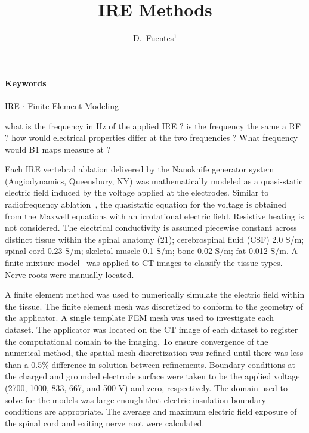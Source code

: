 \documentclass{article}
\begin{document}
\title{\bf \Large
IRE Methods
}

\author{ D.~Fuentes$^1$
}




\maketitle

\paragraph{Keywords} IRE $\cdot$ 
                     Finite Element Modeling

{\color{red} what is the frequency in Hz of the applied IRE ? is the
frequency the same a RF ? how would electrical properties differ at the two
frequencies ? What frequency would B1 maps measure at ? }


Each IRE vertebral ablation 
delivered by the Nanoknife generator system (Angiodynamics, Queensbury, NY)
was mathematically modeled as
a quasi-static electric field induced by the voltage applied at the electrodes.
Similar to radiofrequency ablation~\cite{fuentesjvir},
the quasistatic equation for the voltage is
obtained from the Maxwell equations with an irrotational electric field. 
Resistive heating is not considered. 
The electrical conductivity is assumed piecewise constant across
distinct tissue within the spinal anatomy (21);
cerebrospinal fluid (CSF) 2.0 S/m; spinal cord 0.23
S/m; skeletal muscle 0.1 S/m; bone 0.02 S/m; fat 0.012 S/m.
A finite mixture model~\cite{avants2011} was applied to CT images to
classify the tissue types. Nerve roots were manually located.


A finite element method was used to numerically simulate the
electric field within the tissue. The finite element mesh was discretized to
conform to the geometry of the applicator.
A single template FEM mesh was used to investigate each dataset.
The applicator was located on the CT image of each dataset to register the computational
domain to the imaging.
To ensure convergence of the numerical method, the spatial mesh
discretization was refined until there was less than a 0.5\% difference
in solution between refinements.
Boundary conditions at the 
charged and grounded electrode surface were taken to
be the applied voltage (2700, 1000, 833, 667, and 500 V) and zero, respectively.
The domain used to solve for the models was large enough that electric
insulation boundary conditions are appropriate. 
The average
and maximum electric field exposure of the spinal cord and exiting nerve
root were calculated.  
\end{document}
